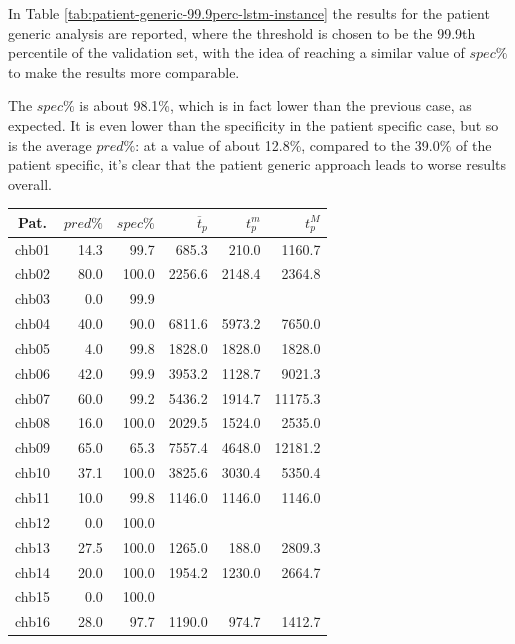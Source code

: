 In Table \ref{tab:patient-generic-99.9perc-lstm-instance} the results for the patient generic analysis are reported, where the threshold is chosen to be the 99.9th percentile of the validation set, with the idea of reaching a similar value of $spec\%$ to make the results more comparable.

The $spec\%$ is about 98.1\%, which is in fact lower than the previous case, as expected. It is even lower than the specificity in the patient specific case, but so is the average $pred\%$: at a value of about 12.8\%, compared to the 39.0\% of the patient specific, it's clear that the patient generic approach leads to worse results overall.

\begin{table}[ht]
    \centering
    \begin{tabular}{c|rrrrr}
    Pat.  & $pred\%$ & $spec\%$ & $\overline{t}_p$   & $t_p^m$  & $t_p^M$   \\ \hline
    chb01   & 14.3   & 99.7   & 685.3   & 210.0   & 1160.7  \\
    chb02   & 80.0   & 100.0  & 2256.6  & 2148.4  & 2364.8  \\
    chb03   & 0.0    & 99.9   &         &         &         \\
    chb04   & 40.0   & 90.0   & 6811.6  & 5973.2  & 7650.0  \\
    chb05   & 4.0    & 99.8   & 1828.0  & 1828.0  & 1828.0  \\
    chb06   & 42.0   & 99.9   & 3953.2  & 1128.7  & 9021.3  \\
    chb07   & 60.0   & 99.2   & 5436.2  & 1914.7  & 11175.3 \\
    chb08   & 16.0   & 100.0  & 2029.5  & 1524.0  & 2535.0  \\
    chb09   & 65.0   & 65.3   & 7557.4  & 4648.0  & 12181.2 \\
    chb10   & 37.1   & 100.0  & 3825.6  & 3030.4  & 5350.4  \\
    chb11   & 10.0   & 99.8   & 1146.0  & 1146.0  & 1146.0  \\
    chb12   & 0.0    & 100.0  &         &         &         \\
    chb13   & 27.5   & 100.0  & 1265.0  & 188.0   & 2809.3  \\
    chb14   & 20.0   & 100.0  & 1954.2  & 1230.0  & 2664.7  \\
    chb15   & 0.0    & 100.0  &         &         &         \\
    chb16   & 28.0   & 97.7   & 1190.0  & 974.7   & 1412.7  \\

\end{tabular}
\end{table}
